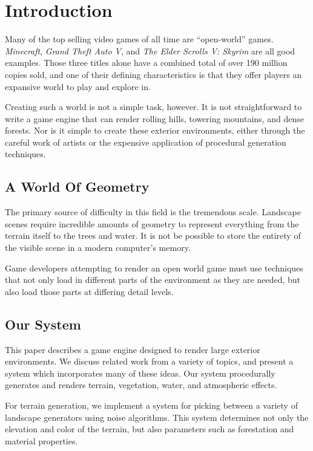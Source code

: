 
\chapter{Introduction}

Many of the top selling video games of all time are ``open-world'' games.
{\em Minecraft}, {\em Grand Theft Auto V}, and {\em The Elder Scrolls V: Skyrim} are all good examples.
Those three titles alone have a combined total of over 190 million copies sold, and one of their defining characteristics is that they offer players an expansive world to play and explore in.

Creating such a world is not a simple task, however.
It is not straightforward to write a game engine that can render rolling hills, towering mountains, and dense forests.
Nor is it simple to create these exterior environments, either through the careful work of artists or the expensive application of procedural generation techniques.


\section{A World Of Geometry}

The primary source of difficulty in this field is the tremendous scale.
Landscape scenes require incredible amounts of geometry to represent everything from the terrain itself to the trees and water.
It is not be possible to store the entirety of the visible scene in a modern computer's memory.

Game developers attempting to render an open world game must use techniques that not only load in different parts of the environment as they are needed, but also load those parts at differing detail levels.


\section{Our System}

This paper describes a game engine designed to render large exterior environments.
We discuss related work from a variety of topics, and present a system which incorporates many of these ideas.
Our system procedurally generates and renders terrain, vegetation, water, and atmospheric effects.

For terrain generation, we implement a system for picking between a variety of landscape generators using noise algorithms.
This system determines not only the elevation and color of the terrain, but also parameters such as forestation and material properties.

